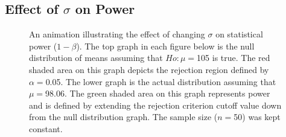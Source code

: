 \documentclass[10pt,openany]{book}\usepackage[]{graphicx}\usepackage[]{color}
\newenvironment{knitrout}{}{} %
\begin{document}
\subsection{Effect of $\sigma$ on Power}
\begin{knitrout}
\color{fgcolor}

















\begin{figure}[hbtp]

{\centering {}

}

\caption[An animation illustrating the effect of changing $\sigma$ on statistical power ($1-\beta$)]{An animation illustrating the effect of changing $\sigma$ on statistical power ($1-\beta$).  The top graph in each figure below is the null distribution of means assuming that $Ho:\mu=$105 is true.  The red shaded area on this graph depicts the rejection region defined by $\alpha=$0.05.  The lower graph is the actual distribution assuming that $\mu=$98.06.  The green shaded area on this graph represents power and is defined by extending the rejection criterion cutoff value down from the null distribution graph.  The sample size ($n=$50) was kept constant.}\label{fig:pwrAnimS}
\end{figure}


\end{knitrout}

\newpage
\end{document}
